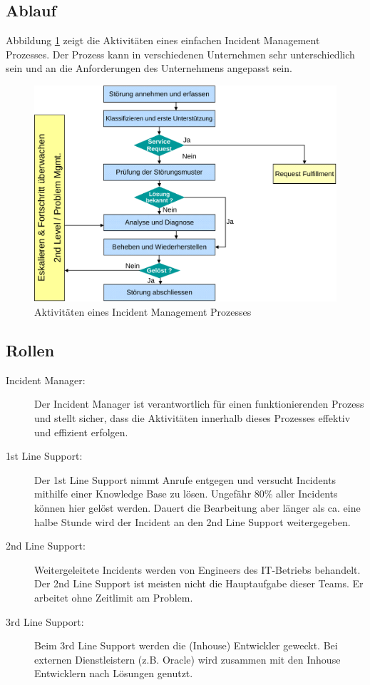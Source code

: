 \subsection{Ablauf}
Abbildung \ref{fig:ablauf-incident-management} zeigt die Aktivitäten eines einfachen Incident Management Prozesses. Der Prozess kann in verschiedenen Unternehmen sehr unterschiedlich sein und an die Anforderungen des Unternehmens angepasst sein.

\begin{figure}[h!]
	\centering
	\includegraphics[width=0.7\linewidth]{fig/ablauf-incident-management}
	\caption{Aktivitäten eines Incident Management Prozesses}
	\label{fig:ablauf-incident-management}
\end{figure}

\subsection{Rollen}
\begin{description}
	\item[Incident Manager:] Der Incident Manager ist verantwortlich für einen funktionierenden Prozess und stellt sicher, dass die Aktivitäten innerhalb dieses Prozesses effektiv und effizient erfolgen.
	\item[1st Line Support:] Der 1st Line Support nimmt Anrufe entgegen und versucht Incidents mithilfe einer Knowledge Base zu lösen. Ungefähr 80\% aller Incidents können hier gelöst werden. Dauert die Bearbeitung aber länger als ca. eine halbe Stunde wird der Incident an den 2nd Line Support weitergegeben.
	\item[2nd Line Support:] Weitergeleitete Incidents werden von Engineers des IT-Betriebs behandelt. Der 2nd Line Support ist meisten nicht die Hauptaufgabe dieser Teams. Er arbeitet ohne Zeitlimit am Problem.
	\item[3rd Line Support:] Beim 3rd Line Support werden die (Inhouse) Entwickler geweckt. Bei externen Dienstleistern (z.B. Oracle) wird zusammen mit den Inhouse Entwicklern nach Lösungen genutzt.
\end{description}

